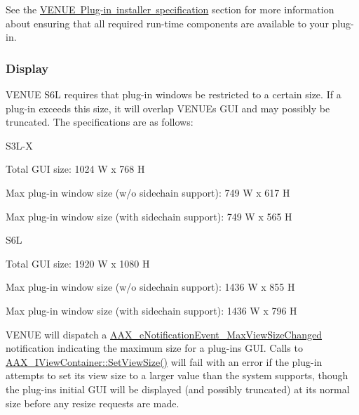  See the \mbox{\hyperlink{a00849_aax_venue_guide__installer}{V\+E\+N\+UE Plug-\/in installer specification}} section for more information about ensuring that all required run-\/time components are available to your plug-\/in.

\hypertarget{a00849_aax_venue_guide__environment__display}{}\subsubsection{Display}\label{a00849_aax_venue_guide__environment__display}
 V\+E\+N\+UE S6L requires that plug-\/in windows be restricted to a certain size. If a plug-\/in exceeds this size, it will overlap V\+E\+N\+UE\textquotesingle{}s G\+UI and may possibly be truncated. The specifications are as follows\+: 
\begin{DoxyItemize}
\item S3\+L-\/X 
\begin{DoxyItemize}
\item Total G\+UI size\+: 1024 W x 768 H 
\item Max plug-\/in window size (w/o sidechain support)\+: 749 W x 617 H 
\item Max plug-\/in window size (with sidechain support)\+: 749 W x 565 H


\end{DoxyItemize}
\item S6L 
\begin{DoxyItemize}
\item Total G\+UI size\+: 1920 W x 1080 H 
\item Max plug-\/in window size (w/o sidechain support)\+: 1436 W x 855 H 
\item Max plug-\/in window size (with sidechain support)\+: 1436 W x 796 H


\end{DoxyItemize}
\end{DoxyItemize}

 V\+E\+N\+UE will dispatch a \mbox{\hyperlink{a00491_afab5ea2cfd731fc8f163b6caa685406ea74ab285136093261fd246572659f119c}{A\+A\+X\+\_\+e\+Notification\+Event\+\_\+\+Max\+View\+Size\+Changed}} notification indicating the maximum size for a plug-\/in\textquotesingle{}s G\+UI. Calls to \mbox{\hyperlink{a01889_ad750e9f0231c61ab32114276ee8cb5f7}{A\+A\+X\+\_\+\+I\+View\+Container\+::\+Set\+View\+Size()}} will fail with an error if the plug-\/in attempts to set its view size to a larger value than the system supports, though the plug-\/in\textquotesingle{}s initial G\+UI will be displayed (and possibly truncated) at its normal size before any resize requests are made.

